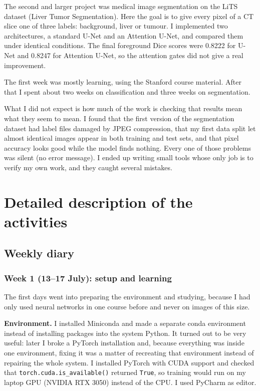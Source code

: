 \documentclass[11pt,a4paper]{article}
\begin{document}
The second and larger project was medical image segmentation on the LiTS dataset
(Liver Tumor Segmentation). Here the goal is to give every pixel of a CT slice
one of three labels: background, liver or tumour. I implemented two
architectures, a standard U-Net and an Attention U-Net, and compared them under
identical conditions. The final foreground Dice scores were 0.8222 for U-Net and
0.8247 for Attention U-Net, so the attention gates did not give a real
improvement.

The first week was mostly learning, using the Stanford course material. After that I spent
about two weeks on classification and three weeks on segmentation.

What I did not expect is how much of the work is checking that results mean what
they seem to mean. I found that the first version of the segmentation dataset had
label files damaged by JPEG compression, that my first data split let almost
identical images appear in both training and test sets, and that pixel accuracy
looks good while the model finds nothing. Every one of those problems was
silent (no error message). I ended up writing small tools whose only job is to
verify my own work, and they caught several mistakes.

\section{Detailed description of the activities}

\subsection{Weekly diary}

\subsubsection*{Week 1 (13--17 July): setup and learning}

The first days went into preparing the environment and studying, because I had
only used neural networks in one course before and never on images of this size.

\textbf{Environment.} I installed Miniconda and made a separate conda
environment instead of installing packages into the system Python. It turned out to be very useful: later I broke a PyTorch
installation and, because everything was inside one environment, fixing it was a
matter of recreating that environment instead of repairing the whole system. I
installed PyTorch with CUDA support and checked that
\texttt{torch.cuda.is\_available()} returned \texttt{True}, so training would run
on my laptop GPU (NVIDIA RTX 3050) instead of the CPU. I used PyCharm as editor.
\end{document}
